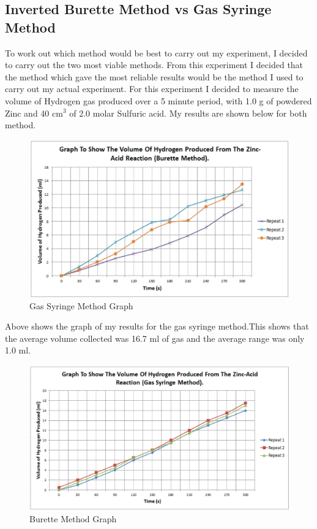 	\subsection{Inverted Burette Method vs Gas Syringe Method} 

To work out which method would be best to carry out my experiment, I decided to carry out the two most viable methods. From this experiment I decided that the method which gave the most reliable results would be the method I used to carry out my actual experiment. For this experiment I decided to measure the volume of Hydrogen gas produced over a 5 minute period, with 1.0 g of powdered Zinc and 40 cm$^3$ of 2.0 molar Sulfuric acid. My results are shown below for both method.

\begin{figure}[H]
    \includegraphics[width=\textwidth]{./preliminarywork/Graphs/GasSyringe.pdf}
    \caption{Gas Syringe Method Graph} \label{fig:Gas Syringe Method Results}
\end{figure}

Above shows the graph of my results for the gas syringe method.This shows that the average volume collected was 16.7 ml of gas and the average range was only 1.0 ml.




\begin{figure}[H]
    \includegraphics[width=\textwidth]{./preliminarywork/Graphs/Burette.pdf}
    \caption{Burette Method Graph} \label{fig:Burette Method Results}
\end{figure}

